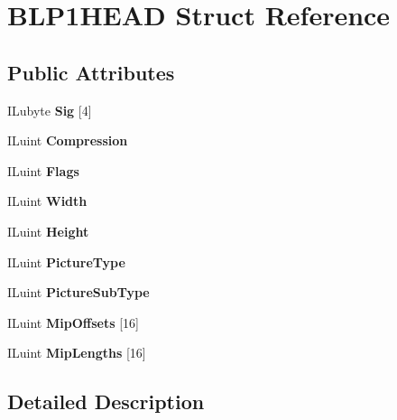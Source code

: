 \hypertarget{structBLP1HEAD}{}\section{B\+L\+P1\+H\+E\+AD Struct Reference}
\label{structBLP1HEAD}
\subsection*{Public Attributes}
\begin{DoxyCompactItemize}
\item 
\mbox{\label{structBLP1HEAD_a8be550a2ecaaa7d13879fa9423a5517e}} 
I\+Lubyte {\bfseries Sig} \mbox{[}4\mbox{]}
\item 
\mbox{\label{structBLP1HEAD_aee84bf8cac13d1d47688e60f85b29826}} 
I\+Luint {\bfseries Compression}
\item 
\mbox{\label{structBLP1HEAD_acd1877a91155a98b61f3ad3288f5c7e8}} 
I\+Luint {\bfseries Flags}
\item 
\mbox{\label{structBLP1HEAD_a87e4479a06145dca88768bcec36b8d28}} 
I\+Luint {\bfseries Width}
\item 
\mbox{\label{structBLP1HEAD_aa00473152508ad942932e18758a10ffb}} 
I\+Luint {\bfseries Height}
\item 
\mbox{\label{structBLP1HEAD_a064b2fa2e1701197395de4cea1bbaa2e}} 
I\+Luint {\bfseries Picture\+Type}
\item 
\mbox{\label{structBLP1HEAD_addf8d1c3431911c84059c9204ae6fa59}} 
I\+Luint {\bfseries Picture\+Sub\+Type}
\item 
\mbox{\label{structBLP1HEAD_ac0b7e618e439bb35eaf359e6fbca664c}} 
I\+Luint {\bfseries Mip\+Offsets} \mbox{[}16\mbox{]}
\item 
\mbox{\label{structBLP1HEAD_ac17279f04d40836cf34d3c3d01897244}} 
I\+Luint {\bfseries Mip\+Lengths} \mbox{[}16\mbox{]}
\end{DoxyCompactItemize}


\subsection{Detailed Description}


